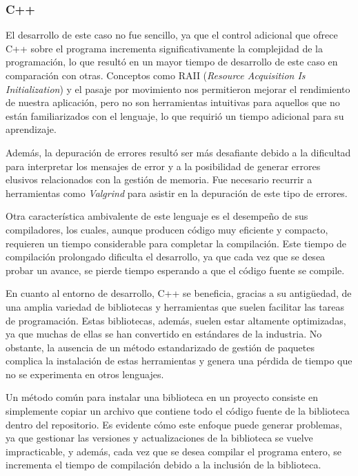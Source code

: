 \documentclass[11pt]{article}
\let\Oldsubsubsection\subsubsection
\renewcommand{\subsubsection}{\FloatBarrier\Oldsubsubsection}
\begin{document}
\subsubsection{C++}

El desarrollo de este caso no fue sencillo, ya que el control adicional que ofrece C++ sobre el programa incrementa significativamente la complejidad de la programación, lo que resultó en un mayor tiempo de desarrollo de este caso en comparación con otras. Conceptos como RAII (\textit{Resource Acquisition Is Initialization}) \cite{cpp:doc:raii} y el pasaje por movimiento nos permitieron mejorar el rendimiento de nuestra aplicación, pero no son herramientas intuitivas para aquellos que no están familiarizados con el lenguaje, lo que requirió un tiempo adicional para su aprendizaje.

Además, la depuración de errores resultó ser más desafiante debido a la dificultad para interpretar los mensajes de error y a la posibilidad de generar errores elusivos relacionados con la gestión de memoria. Fue necesario recurrir a herramientas como \textit{Valgrind} \cite{cpp:lib:valgrind} para asistir en la depuración de este tipo de errores.

Otra característica ambivalente de este lenguaje es el desempeño de sus compiladores, los cuales, aunque producen código muy eficiente y compacto, requieren un tiempo considerable para completar la compilación. Este tiempo de compilación prolongado dificulta el desarrollo, ya que cada vez que se desea probar un avance, se pierde tiempo esperando a que el código fuente se compile.

En cuanto al entorno de desarrollo, C++ se beneficia, gracias a su antigüedad, de una amplia variedad de bibliotecas y herramientas que suelen facilitar las tareas de programación. Estas bibliotecas, además, suelen estar altamente optimizadas, ya que muchas de ellas se han convertido en estándares de la industria. No obstante, la ausencia de un método estandarizado de gestión de paquetes complica la instalación de estas herramientas y genera una pérdida de tiempo que no se experimenta en otros lenguajes.

Un método común para instalar una biblioteca en un proyecto consiste en simplemente copiar un archivo que contiene todo el código fuente de la biblioteca dentro del repositorio. Es evidente cómo este enfoque puede generar problemas, ya que gestionar las versiones y actualizaciones de la biblioteca se vuelve impracticable, y además, cada vez que se desea compilar el programa entero, se incrementa el tiempo de compilación debido a la inclusión de la biblioteca.
\end{document}
